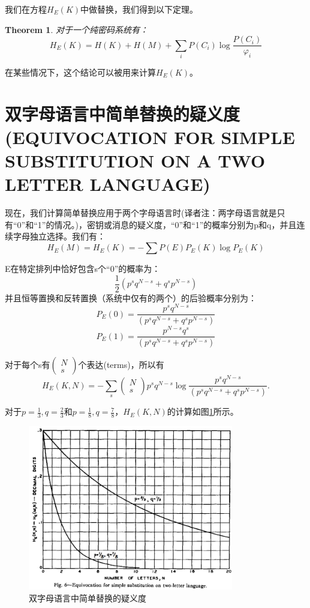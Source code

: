 \documentclass[]{article}
\newtheorem{theorem}{Theorem}
\begin{document}
我们在方程$H_E(K)$中做替换，我们得到以下定理。

\begin{theorem}
	对于一个纯密码系统有：
	\[H_E(K) = H(K) + H(M) + \sum_{i} {P(C_i)\log{\dfrac{P(C_i)}{\varphi_i}}}\]
\end{theorem}

在某些情况下，这个结论可以被用来计算$H_E(K)$。

\newpage
%   
%

\section{双字母语言中简单替换的疑义度(EQUIVOCATION FOR SIMPLE SUBSTITUTION ON A TWO LETTER LANGUAGE)}

现在，我们计算简单替换应用于两个字母语言时(译者注：两字母语言就是只有“0”和“1”的情况。)，密钥或消息的疑义度，“0”和“1”的概率分别为p和q，并且连续字母独立选择。我们有：
\[H_E(M)=H_E(K)=-\sum {P(E)P_E(K)\log{P_E(K)}}\]

E在特定排列中恰好包含s个“0”的概率为：
\[\dfrac{1}{2} (p^s q^{N-s}+q^s p^{N-s})\]
并且恒等置换和反转置换（系统中仅有的两个）的后验概率分别为：
\[P_E(0)=\dfrac{p^s q^{N-s}}{(p^s q^{N-s}+q^s p^{N-s})}\]
\[P_E(1)=\dfrac{p^{N-s}q^s}{(p^s q^{N-s} + q^s p^{N-s})}\]

对于每个s有$\begin{pmatrix}
N\\
s
\end{pmatrix}$个表达(terms)，所以有
\[H_E(K,N) = -\sum_{s} \begin{pmatrix}
N\\
s\end{pmatrix} p^s q^{N-s} \log{\dfrac{p^s q^{N-s}}{(p^s q^{N-s}+q^s p^{N-s})}}.\]

对于$p=\frac{1}{3},q=\frac{2}{3}$和$p=\frac{1}{8},q=\frac{7}{8}$，$H_E(K,N)$的计算如图\ref{fig:fig6}所示。


\begin{figure}[H]
	\centering
	\includegraphics[width=0.8\textwidth]{fig6.png}
	\caption{双字母语言中简单替换的疑义度}
	\label{fig:fig6}
\end{figure}
\end{document}
